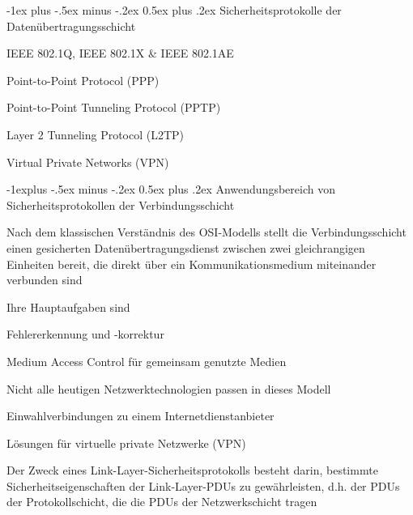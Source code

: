\documentclass[a4paper]{article}
\makeatletter
\renewcommand{\section}{\@startsection{section}{1}{0mm}%
 {-1ex plus -.5ex minus -.2ex}%
 {0.5ex plus .2ex}%
 {\normalfont\large\bfseries}}
\renewcommand{\subsection}{\@startsection{subsection}{2}{0mm}%
 {-1explus -.5ex minus -.2ex}%
 {0.5ex plus .2ex}%
 {\normalfont\normalsize\bfseries}}
\makeatother
\begin{document}
\begin{multicols}{3}
      \section{Sicherheitsprotokolle der Datenübertragungsschicht}
      \begin{itemize*}
            \item IEEE 802.1Q, IEEE 802.1X \& IEEE 802.1AE
            \item Point-to-Point Protocol (PPP)
            \item Point-to-Point Tunneling Protocol (PPTP)
            \item Layer 2 Tunneling Protocol (L2TP)
            \item Virtual Private Networks (VPN)
      \end{itemize*}

      \subsection{Anwendungsbereich von Sicherheitsprotokollen der Verbindungsschicht}
      \begin{itemize*}
            \item Nach dem klassischen Verständnis des OSI-Modells stellt die Verbindungsschicht einen gesicherten Datenübertragungsdienst zwischen zwei gleichrangigen Einheiten bereit, die direkt über ein Kommunikationsmedium miteinander verbunden sind
            \item Ihre Hauptaufgaben sind
            \begin{itemize*}
                  \item Fehlererkennung und -korrektur
                  \item Medium Access Control für gemeinsam genutzte Medien
            \end{itemize*}
            \item Nicht alle heutigen Netzwerktechnologien passen in dieses Modell
            \begin{itemize*}
                  \item Einwahlverbindungen zu einem Internetdienstanbieter
                  \item Lösungen für virtuelle private Netzwerke (VPN)
            \end{itemize*}
            \item Der Zweck eines Link-Layer-Sicherheitsprotokolls besteht darin, bestimmte Sicherheitseigenschaften der Link-Layer-PDUs zu gewährleisten, d.h. der PDUs der Protokollschicht, die die PDUs der Netzwerkschicht tragen
      \end{itemize*}


\end{multicols}
\end{document}
